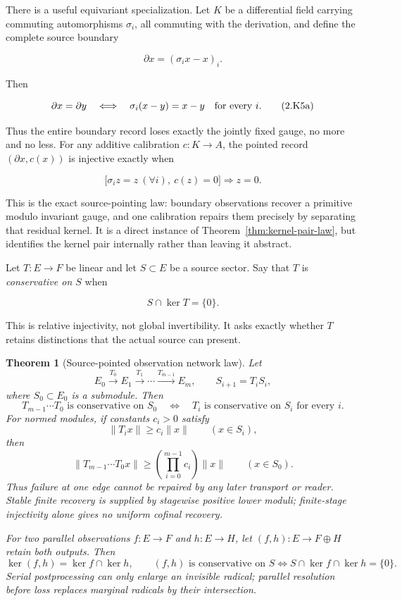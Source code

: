 \documentclass[11pt]{article}
\newtheorem{theorem}{Theorem}[section]
\theoremstyle{definition}
\theoremstyle{remark}
\begin{document}
There is a useful equivariant specialization.  Let \(K\) be a differential
field carrying commuting automorphisms \(\sigma_i\), all commuting with the
derivation, and define the complete source boundary


\[
             \partial x=(\sigma_i x-x)_i .
\tag{2.K5}\label{eq:complete-difference-boundary}
\]


Then


\[
 \partial x=\partial y
 \quad\Longleftrightarrow\quad
 \sigma_i(x-y)=x-y\quad\hbox{for every }i.
\tag{2.K5a}\label{eq:difference-boundary-kernel}
\]


Thus the entire boundary record loses exactly the jointly fixed gauge, no
more and no less.  For any additive calibration \(c:K\to A\), the pointed
record \((\partial x,c(x))\) is injective exactly when


\[
 \bigl[\sigma_i z=z\ (\forall i),\ c(z)=0\bigr]
                 \Longrightarrow z=0.
\tag{2.K5b}\label{eq:pointed-boundary-conservativity}
\]


This is the exact source-pointing law: boundary observations recover a
primitive modulo invariant gauge, and one calibration repairs them precisely
by separating that residual kernel.  It is a direct instance of
Theorem~\ref{thm:kernel-pair-law}, but identifies the kernel pair internally
rather than leaving it abstract.

Let \(T:E\to F\) be linear and let \(S\subset E\) be a source sector.  Say
that \(T\) is \emph{conservative on \(S\)} when

\[
                         S\cap\ker T=\{0\}.
\tag{2.0}\label{eq:conservative-on}
\]

This is relative injectivity, not global invertibility.  It asks exactly
whether \(T\) retains distinctions that the actual source can present.

\begin{theorem}[Source-pointed observation network law]
\label{thm:chain-law}
Let
\[
 E_0\xrightarrow{T_0}E_1\xrightarrow{T_1}\cdots
 \xrightarrow{T_{m-1}}E_m,
\qquad S_{i+1}=T_iS_i,
\]
where \(S_0\subset E_0\) is a submodule.  Then
\[
 T_{m-1}\cdots T_0\text{ is conservative on }S_0
 \quad\Longleftrightarrow\quad
 T_i\text{ is conservative on }S_i\text{ for every }i.
\tag{2.0a}\label{eq:chain-law}
\]
For normed modules, if constants \(c_i>0\) satisfy
\[
             \|T_ix\|\ge c_i\|x\|\qquad(x\in S_i),
\]
then
\[
 \|T_{m-1}\cdots T_0x\|
       \ge\left(\prod_{i=0}^{m-1}c_i\right)\|x\|
       \qquad(x\in S_0).
\tag{2.0b}\label{eq:chain-modulus}
\]
Thus failure at one edge cannot be repaired by any later transport or
reader.  Stable finite recovery is supplied by stagewise positive lower
moduli; finite-stage injectivity alone gives no uniform cofinal recovery.

For two parallel observations \(f:E\to F\) and \(h:E\to H\), let
\((f,h):E\to F\oplus H\) retain both outputs.  Then
\[
 \ker(f,h)=\ker f\cap\ker h,
 \qquad
 (f,h)\text{ is conservative on }S
 \Longleftrightarrow S\cap\ker f\cap\ker h=\{0\}.
\tag{2.0c}\label{eq:parallel-law}
\]
Serial postprocessing can only enlarge an invisible radical; parallel
resolution before loss replaces marginal radicals by their intersection.
\end{theorem}
\end{document}
